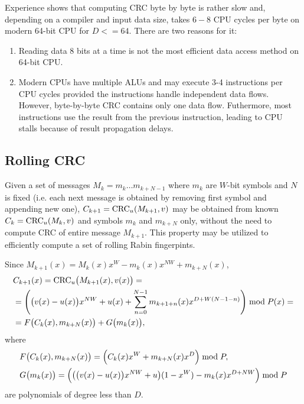 \documentclass{article}
\begin{document}
Experience shows that computing CRC byte by byte is rather slow and,
depending on a compiler and input data size, takes $6-8$ CPU cycles per
byte on modern 64-bit CPU for $D <= 64$. There are two reasons for it:

\begin{enumerate}
\item
  Reading data 8 bits at a time is not the most efficient data access
  method on 64-bit CPU.
\item
  Modern CPUs have multiple ALUs and may execute 3-4 instructions per CPU
  cycles provided the instructions handle independent data flows. However,
  byte-by-byte CRC contains only one data flow. Futhermore, most
  instructions use the result from the previous instruction, leading to CPU
  stalls because of result propagation delays.
\end{enumerate}


\subsection{Rolling CRC} \label{s:rollingcrc}

Given a set of messages $M_k=m_{k} \ldots m_{k+N-1}$ where $m_k$ are
$W$-bit symbols and $N$ is fixed (i.e. each next message is obtained by
removing first symbol and appending new one), $C_{k+1} = {\rm CRC}_u(M_{k+1}, v)$
may be obtained from known $C_k = {\rm CRC}_u(M_k, v)$ and symbols $m_k$ and
$m_{k+N}$ only, without the need to compute CRC of entire message
$M_{k+1}$. This property may be utilized to efficiently compute a set of
rolling Rabin fingerpints.

Since $M_{k+1}(x) = M_k(x) x^W - m_{k}(x) x^{NW} + m_{k+N}(x)$,
  \begin{align*}
    & C_{k+1}(x) = {\rm CRC}_u\bigl(M_{k+1}(x), v(x)\bigr) = \\
    &= \left(\bigl(v(x)-u(x)\bigr) x^{NW} + u(x) + \sum_{n=0}^{N-1} m_{k+1+n}(x) x^{D+W(N-1-n)} \right) \bmod P(x) = \\
    &= F\bigl(C_k(x), m_{k+N}(x)\bigr) + G\bigl(m_k(x)\bigr),
  \end{align*}
where
  \begin{align*}
    & F\bigl(C_k(x), m_{k+N}(x)\bigr) = \Bigl(C_k(x) x^W + m_{k+N}(x) x^D\Bigr) \bmod P, \\
    & G\bigl(m_k(x)\bigr) = \Bigl(\bigl(\bigl(v(x)-u(x)\bigr) x^{NW} + u\bigr) (1 - x^W) - m_k(x) x^{D+NW} \Bigr) \bmod P
  \end{align*}
are polynomials of degree less than $D$.
\end{document}
